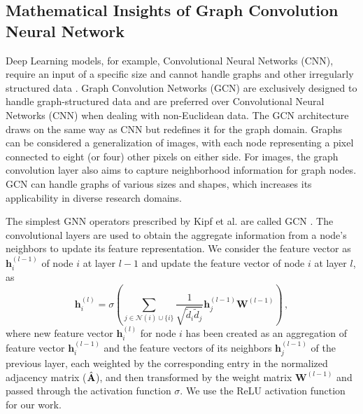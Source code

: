 \documentclass[aps, prd, showpacs, floatfix, superscriptaddress, twocolumn, nofootinbib, preprintnumbers, longbibliography]{revtex4-2}
\begin{document}
\subsection{Mathematical Insights of Graph Convolution Neural Network}
Deep Learning models, for example, Convolutional Neural Networks (CNN), require an input of a specific size and cannot handle graphs and other irregularly structured data \cite{graphclass2018}. Graph Convolution Networks (GCN) are exclusively designed to handle graph-structured data and are preferred over Convolutional Neural Networks (CNN) when dealing with non-Euclidean data. The GCN architecture draws on the same way as CNN but redefines it for the graph domain. Graphs can be considered a generalization of images, with each node representing a pixel connected to eight (or four) other pixels on either side. For images, the graph convolution layer also aims to capture neighborhood information for graph nodes. GCN can handle graphs of various sizes and shapes, which increases its applicability in diverse research domains.

The simplest GNN operators prescribed by Kipf et al. are called GCN  \cite{kipf2016semi}. The convolutional layers are used to obtain the aggregate information from a node's neighbors to update its feature representation. We consider the feature vector as $\bm{h}_i^{(l-1)}$ of node $i$ at layer $l-1$ and update the feature vector of node $i$ at layer $l$, as
\begin{equation}
\bm{h}_i^{(l)} = \sigma \left( \sum_{j \in \mathcal{N}(i) \cup \{i\}} \frac{1}{\sqrt{\tilde{d}_{i} \tilde{d}_{j}}} \bm{h}_j^{(l-1)} \mathbf{W}^{(l-1)} \right) \, ,
\end{equation} 
where new feature vector $\bm{h}_i^{(l)}$ for node $i$ has been created as an aggregation of feature vector $\bm{h}_i^{(l-1)}$ and the feature vectors of its neighbors $\bm{h}_j^{(l-1)}$ of the previous layer, each weighted by the corresponding entry in the normalized adjacency matrix ($\hat{{\bf A}}$), and then transformed by the weight matrix $\mathbf{W}^{(l-1)}$ and passed through the activation function $\sigma$. 
We use the ReLU activation function for our work.
\end{document}

